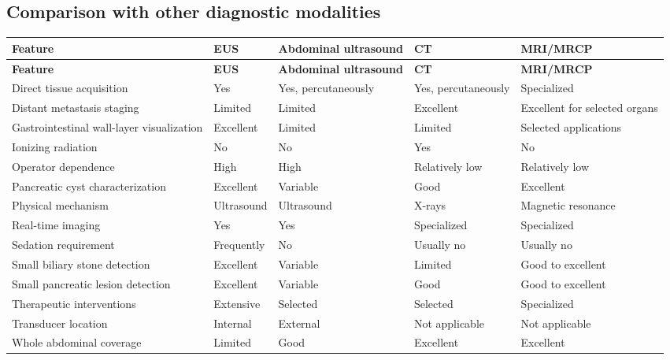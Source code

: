 \subsection{Comparison with other diagnostic modalities}
\begin{longtable}{@{}p{}p{}p{}p{}p{}@{}}
\toprule
\textbf{Feature} & \textbf{EUS} & \textbf{Abdominal ultrasound} & \textbf{CT} & \textbf{MRI/MRCP} \\
\midrule
\endfirsthead
\toprule
\textbf{Feature} & \textbf{EUS} & \textbf{Abdominal ultrasound} & \textbf{CT} & \textbf{MRI/MRCP} \\
\midrule
\endhead
Direct tissue acquisition & Yes & Yes, percutaneously & Yes, percutaneously & Specialized \\
Distant metastasis staging & Limited & Limited & Excellent & Excellent for selected organs \\
Gastrointestinal wall-layer visualization & Excellent & Limited & Limited & Selected applications \\
Ionizing radiation & No & No & Yes & No \\
Operator dependence & High & High & Relatively low & Relatively low \\
Pancreatic cyst characterization & Excellent & Variable & Good & Excellent \\
Physical mechanism & Ultrasound & Ultrasound & X-rays & Magnetic resonance \\
Real-time imaging & Yes & Yes & Specialized & Specialized \\
Sedation requirement & Frequently & No & Usually no & Usually no \\
Small biliary stone detection & Excellent & Variable & Limited & Good to excellent \\
Small pancreatic lesion detection & Excellent & Variable & Good & Good to excellent \\
Therapeutic interventions & Extensive & Selected & Selected & Specialized \\
Transducer location & Internal & External & Not applicable & Not applicable \\
Whole abdominal coverage & Limited & Good & Excellent & Excellent \\
\bottomrule
\end{longtable}

